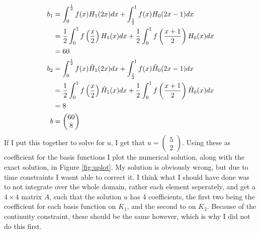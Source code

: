 \documentclass[aps, 12pt]{revtex4}
\begin{document}
\begin{align*}
    b_1 & = \int_0^{\frac{1}{2}} f(x)H_1(2x)dx + \int_{\frac{1}{2}}^1 f(x)H_0(2x-1)dx
    \\
        & = \frac{1}{2}\int_0^1 f\left(\frac{x}{2}\right)H_1(x)dx + \frac{1}{2}\int_0^1 f\left(\frac{x+1}{2}\right)H_0(x)dx
    \\
        & = 60
    \\
    b_2 & = \int_0^{\frac{1}{2}} f(x)\tilde{H}_1(2x)dx + \int_{\frac{1}{2}}^1 f(x)\tilde{H}_0(2x-1)dx
    \\
        & = \frac{1}{2}\int_0^1 f\left(\frac{x}{2}\right)\tilde{H}_1(x)dx + \frac{1}{2}\int_0^1 f\left(\frac{x+1}{2}\right)\tilde{H}_0(x)dx
    \\
        & = 8
    \\
    b   & = \begin{pmatrix}
        60 \\ 8
    \end{pmatrix}
\end{align*}
If I put this together to solve for $u$, I get that $u=\begin{pmatrix}
        5 \\ 2
    \end{pmatrix}$. Using these as coefficient for the basis functions I plot the numerical solution, along with the exact solution, in Figure \ref{fig:uplot}. My solution is obviously wrong, but due to time constraints I wasnt able to correct it. I think what I should have done was to not integrate over the whole domain, rather each element seperately, and get a $4\times 4$ matrix $A$, such that the solution $u$ has 4 coefficients, the first two being the coefficient for each basis function on $K_1$, and the second to on $K_2$. Because of the continuity constraint, these should be the same however, which is why I did not do this first.
\end{document}

